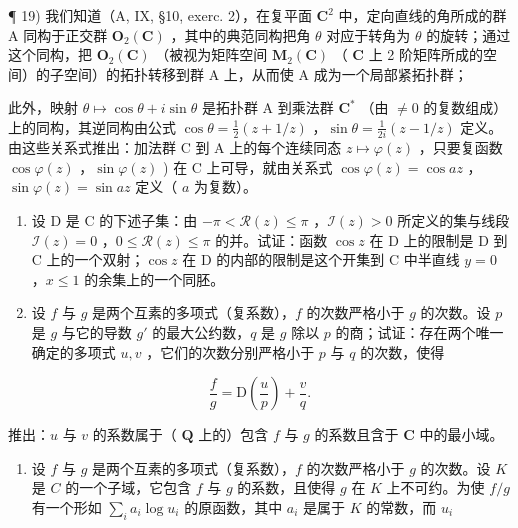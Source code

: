 ¶ 19) 我们知道（A, IX, §10, exerc. 2），在复平面 \(\mathbf{C}^2\) 中，定向直线的角所成的群 A 同构于正交群 \(\mathbf{O}_2(\mathbf{C})\) ，其中的典范同构把角 \(\theta\) 对应于转角为 \(\theta\) 的旋转；通过这个同构，把 \(\mathbf{O}_2(\mathbf{C})\) （被视为矩阵空间 \(\mathbf{M}_2(\mathbf{C})\) （ \(\mathbf{C}\) 上 2 阶矩阵所成的空间）的子空间）的拓扑转移到群 A 上，从而使 A 成为一个局部紧拓扑群；

此外，映射 \(\theta \mapsto \cos \theta + i\sin \theta\) 是拓扑群 A 到乘法群 \(\mathbf{C}^*\) （由 \(\neq 0\) 的复数组成）上的同构，其逆同构由公式 \(\cos \theta = \frac{1}{2}(z + 1 / z)\) ，\(\sin \theta = \frac{1}{2i} (z - 1 / z)\) 定义。由这些关系式推出：加法群 C 到 A 上的每个连续同态 \(z \mapsto \varphi(z)\) ，只要复函数 \(\cos \varphi(z)\) ，\(\sin \varphi(z)\) ) 在 C 上可导，就由关系式 \(\cos \varphi(z) = \cos az\) ，\(\sin \varphi(z) = \sin az\) 定义（ \(a\) 为复数）。

\begin{enumerate}
\def\labelenumi{\arabic{enumi})}
\setcounter{enumi}{19}
\item
  设 D 是 C 的下述子集：由 \(-\pi < \mathcal{R}(z) \leqslant \pi\) ，\(\mathcal{I}(z) > 0\) 所定义的集与线段 \(\mathcal{I}(z) = 0\) ，\(0 \leqslant \mathcal{R}(z) \leqslant \pi\) 的并。试证：函数 \(\cos z\) 在 D 上的限制是 D 到 C 上的一个双射；\(\cos z\) 在 D 的内部的限制是这个开集到 C 中半直线 \(y = 0\) ，\(x \leqslant 1\) 的余集上的一个同胚。
\item
  设 \(f\) 与 \(g\) 是两个互素的多项式（复系数），\(f\) 的次数严格小于 \(g\) 的次数。设 \(p\) 是 \(g\) 与它的导数 \(g'\) 的最大公约数，\(q\) 是 \(g\) 除以 \(p\) 的商；试证：存在两个唯一确定的多项式 \(u, v\) ，它们的次数分别严格小于 \(p\) 与 \(q\) 的次数，使得
\end{enumerate}

\[
{\frac {f}{g}} = \mathrm{D} \left({\frac {u}{p}}\right) + {\frac {v}{q}}.
\]

推出：\(u\) 与 \(v\) 的系数属于（ \(\mathbf{Q}\) 上的）包含 \(f\) 与 \(g\) 的系数且含于 \(\mathbf{C}\) 中的最小域。

\begin{enumerate}
\def\labelenumi{\arabic{enumi})}
\setcounter{enumi}{21}
\tightlist
\item
  设 \(f\) 与 \(g\) 是两个互素的多项式（复系数），\(f\) 的次数严格小于 \(g\) 的次数。设 \(K\) 是 \(C\) 的一个子域，它包含 \(f\) 与 \(g\) 的系数，且使得 \(g\) 在 \(K\) 上不可约。为使 \(f / g\) 有一个形如 \(\sum_{i} a_i \log u_i\) 的原函数，其中 \(a_i\) 是属于 \(K\) 的常数，而 \(u_i\)
\end{enumerate}

